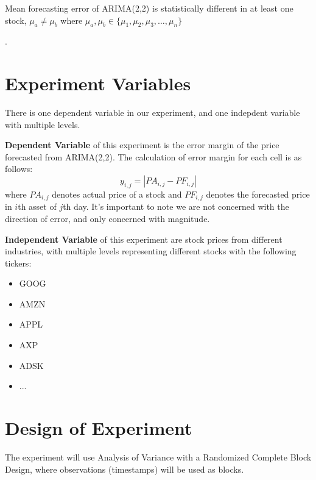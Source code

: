 \documentclass{article}
\begin{document}
    \begin{hyp} 
        \label{hyp:b}Mean forecasting error of ARIMA(2,2) is statistically different in at least one stock, $\mu_{a} \neq \mu_{b}$ where \( \mu_{a},\mu_{b} \in \{\mu_{1}, \mu_{2},\mu_{3}, \dots, \mu_{n} \} \)

        .
    \end{hyp}
   

    \section{Experiment Variables}
        There is one dependent variable in our experiment, and one indepdent variable with multiple levels.
        \medskip

        \textbf{Dependent Variable} of this experiment is the error margin of the price forecasted from ARIMA(2,2). The calculation of error margin for each cell is as follows: \[ y_{i,j} = |PA_{i,j} - PF_{i,j}| \] where $PA_{i,j}$ denotes actual price of a stock and $PF_{i,j}$ denotes the forecasted price in $i$th asset of $j$th day. It's important to note we are not concerned with the direction of error, and only concerned with magnitude.

        \medskip

        \textbf{Independent Variable} of this experiment are stock prices from different industries, with multiple levels representing different stocks with the following tickers:
        \begin{itemize}
            \item GOOG
            \item AMZN
            \item APPL
            \item AXP
            \item ADSK
            \item ...
        \end{itemize}

    \section{Design of Experiment}
    The experiment will use Analysis of Variance with a Randomized Complete Block Design, where observations (timestamps) will be used as blocks.
\end{document}
